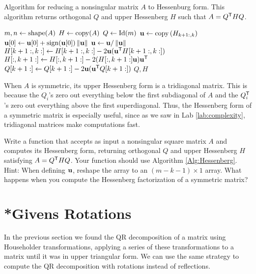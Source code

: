 \begin{algorithm}
\caption{Algorithm for reducing a nonsingular matrix $A$ to Hessenburg form. 
This algorithm returns orthogonal $Q$ and upper Hessenberg $H$ such that $A = Q^{\mathsf T} HQ$.}
\label{Alg:Hessenberg}
\begin{algorithmic}[1]
\State $m, n \gets \mathrm{shape}(A)$
\State $H \gets \mathrm{copy}(A)$
\State $Q \gets \mathrm{Id}(m)$
    \State ${\bf u} \gets \text{copy}\left(H_{k+1:, k}\right)$
    \State ${\bf u}[0] \gets {\bf u}[0] + \text{sign}({\bf u}[0]) \left\lVert{\bf u}\right\rVert$
    \State ${\bf u} \gets {\bf u}/\left\lVert{\bf u}\right\rVert$
    \State $H[k+1:,k:] \gets H[k+1:,k:] - 2{\bf u}({\bf u}^{\mathsf T} H[k+1:,k:])$
    \State $H[:,k+1:] \gets H[:,k+1:] - 2(H[:,k+1:] {\bf u}) {\bf u}^{\mathsf T}$
    \State $Q[k+1:] \gets Q[k+1:] - 2{\bf u}({\bf u}^{\mathsf T} Q[k+1:])$
\EndFor
\State {} $Q, H$
\EndProcedure
\end{algorithmic}
\end{algorithm}

When $A$ is symmetric, its upper Hessenberg form is a tridiagonal matrix. 
This is because the $Q_i$'s zero out everything below the first subdiagonal of $A$ and the $Q_i^{\mathsf T}$'s zero out everything above the first superdiagonal.
Thus, the Hessenberg form of a symmetric matrix is especially useful, since as we saw in Lab \ref{lab:complexity}, tridiagonal matrices make computations fast.




\begin{problem}
\label{prob:hessenberg}
Write a function that accepts as input a nonsingular square matrix $A$ and computes its Hessenberg form, returning orthogonal $Q$ and upper Hessenberg $H$ satisfying $A = Q^{\mathsf T} HQ$. 
Your function should use Algorithm \ref{Alg:Hessenberg}. Hint: When defining ${\bf u}$, reshape the array to an $(m-k-1) \times 1$ array.  What happens when you compute the Hessenberg factorization of a symmetric matrix?
\end{problem}

\section*{*Givens Rotations}

In the previous section we found the QR decomposition of a matrix using Householder transformations, applying a series of these transformations to a matrix until it was in upper triangular form.
We can use the same strategy to compute the QR decomposition with rotations instead of reflections.


